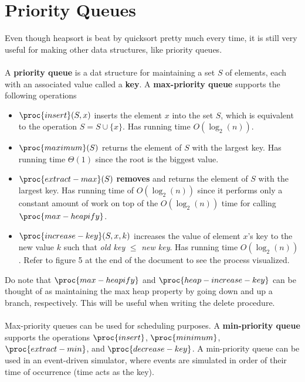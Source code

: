 \documentclass{article}
\begin{document}
\newpage

\section*{Priority Queues}
Even though heapsort is beat by quicksort pretty much every time, it is still very useful for making other data structures, like priority queues.
\\ \\
A \textbf{priority queue} is a dat structure for maintaining a set $S$ of elements, each with an associated value called a \textbf{key}. A \textbf{max-priority queue} supports the following operations

\begin{itemize}
    \item[] $\proc{insert}(S, x)$ inserts the element $x$ into the set $S$, which is equivalent to the operation $S = S \cup \{x\}$. Has running time $O(\log_2(n))$.
    \item[] $\proc{maximum}(S)$ returns the element of $S$ with the largest key. Has running time $\Theta{(1)}$ since the root is the biggest value.
    \item[] $\proc{extract-max}(S)$ \textbf{removes} and returns the element of $S$ with the largest key. Has running time of $O(\log_2(n))$ since it performs only a constant amount of work on top of the $O(\log_2(n))$ time for calling $\proc{max-heapify}$.
    \item[] $\proc{increase-key}(S, x, k)$ increases the value of element $x$'s key to the new value $k$ such that \textit{old key} $\leq$ \textit{new key}. Has running time $O(\log_2(n))$. Refer to figure 5 at the end of the document to see the process visualized.
\end{itemize}
Do note that $\proc{max-heapify}$ and $\proc{heap-increase-key}$ can be thought of as maintaining the max heap property by going down and up a branch, respectively. This will be useful when writing the delete procedure.
\\ \\
Max-priority queues can be used for scheduling purposes. A \textbf{min-priority queue} supports the operations $\proc{insert}$, $\proc{minimum}$, $\proc{extract-min}$, and $\proc{decrease-key}$. A min-priority queue can be used in an event-driven simulator, where events are simulated in order of their time of occurrence (time acts as the key).

\newpage
\end{document}
